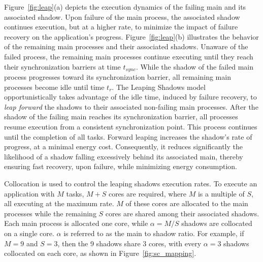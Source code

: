 Figure~\ref{fig:leap}(a) depicts the execution dynamics of the failing main and its associated shadow. Upon failure of the main process, the associated shadow continues execution, but at a higher rate, to minimize the impact of failure recovery on the application's progress. 
Figure~\ref{fig:leap}(b) illustrates the behavior of the remaining main processes and their associated shadows. Unaware of the failed process, the remaining main processes continue executing until they reach their synchronization barriers at time $t_{sync}$. While the shadow of the failed main process progresses toward its synchronization barrier, all remaining main processes become idle until time $t_r$. %
The Leaping Shadows model opportunistically takes advantage of the idle time, induced by failure recovery, to {\it leap forward} the shadows to their associated non-failing main processes. 
After the shadow of the failing main reaches its synchronization barrier, all processes resume execution from a consistent synchronization point. This process continues until the completion of all tasks. Forward leaping increases the shadow's rate of progress, at a minimal energy cost. Consequently, it reduces significantly the likelihood of a shadow falling excessively behind its associated main, thereby ensuring fast recovery, upon failure, while minimizing energy consumption.

Collocation is used to control the leaping shadows execution rates. To execute an application with $M$ tasks, $M+S$ cores are required, where $M$ is a multiple of $S$, all executing at the maximum rate. $M$ of these cores are allocated to the main processes while the remaining $S$ cores are shared among their associated shadows. Each main process is allocated one core, while $\alpha=M/S$ shadows are collocated on a single core. $\alpha$ is referred to as the main to shadow ratio. For example, if $M=9$ and $S=3$, then the 9 shadows share 3 cores, with every $\alpha=3$ shadows collocated on each core, as shown in Figure~\ref{fig:sc_mapping}.
  
